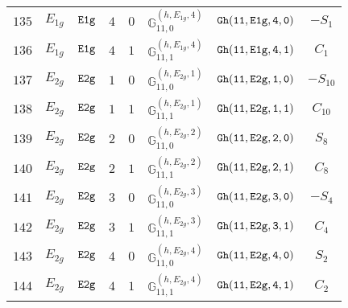 \documentclass[fleqn,8pt]{jsarticle}
\begin{document}
\begin{table}[ht!]
\begin{center}
\begin{tabular}{cccccccc}
$ 135 $ & $ E_{1g} $ & $ {\tt E1g} $ & $ 4 $ & $ 0 $ & $ \mathbb{G}_{11,0}^{(h,E_{1g},4)} $ & $ {\tt Gh(11,E1g,4,0)} $ & $ - S_{1} $ \\
$ 136 $ & $ E_{1g} $ & $ {\tt E1g} $ & $ 4 $ & $ 1 $ & $ \mathbb{G}_{11,1}^{(h,E_{1g},4)} $ & $ {\tt Gh(11,E1g,4,1)} $ & $ C_{1} $ \\
$ 137 $ & $ E_{2g} $ & $ {\tt E2g} $ & $ 1 $ & $ 0 $ & $ \mathbb{G}_{11,0}^{(h,E_{2g},1)} $ & $ {\tt Gh(11,E2g,1,0)} $ & $ - S_{10} $ \\
$ 138 $ & $ E_{2g} $ & $ {\tt E2g} $ & $ 1 $ & $ 1 $ & $ \mathbb{G}_{11,1}^{(h,E_{2g},1)} $ & $ {\tt Gh(11,E2g,1,1)} $ & $ C_{10} $ \\
$ 139 $ & $ E_{2g} $ & $ {\tt E2g} $ & $ 2 $ & $ 0 $ & $ \mathbb{G}_{11,0}^{(h,E_{2g},2)} $ & $ {\tt Gh(11,E2g,2,0)} $ & $ S_{8} $ \\
$ 140 $ & $ E_{2g} $ & $ {\tt E2g} $ & $ 2 $ & $ 1 $ & $ \mathbb{G}_{11,1}^{(h,E_{2g},2)} $ & $ {\tt Gh(11,E2g,2,1)} $ & $ C_{8} $ \\
$ 141 $ & $ E_{2g} $ & $ {\tt E2g} $ & $ 3 $ & $ 0 $ & $ \mathbb{G}_{11,0}^{(h,E_{2g},3)} $ & $ {\tt Gh(11,E2g,3,0)} $ & $ - S_{4} $ \\
$ 142 $ & $ E_{2g} $ & $ {\tt E2g} $ & $ 3 $ & $ 1 $ & $ \mathbb{G}_{11,1}^{(h,E_{2g},3)} $ & $ {\tt Gh(11,E2g,3,1)} $ & $ C_{4} $ \\
$ 143 $ & $ E_{2g} $ & $ {\tt E2g} $ & $ 4 $ & $ 0 $ & $ \mathbb{G}_{11,0}^{(h,E_{2g},4)} $ & $ {\tt Gh(11,E2g,4,0)} $ & $ S_{2} $ \\
$ 144 $ & $ E_{2g} $ & $ {\tt E2g} $ & $ 4 $ & $ 1 $ & $ \mathbb{G}_{11,1}^{(h,E_{2g},4)} $ & $ {\tt Gh(11,E2g,4,1)} $ & $ C_{2} $ \\
 \hline \hline
\end{tabular}
\end{center}
\end{table}
\end{document}
